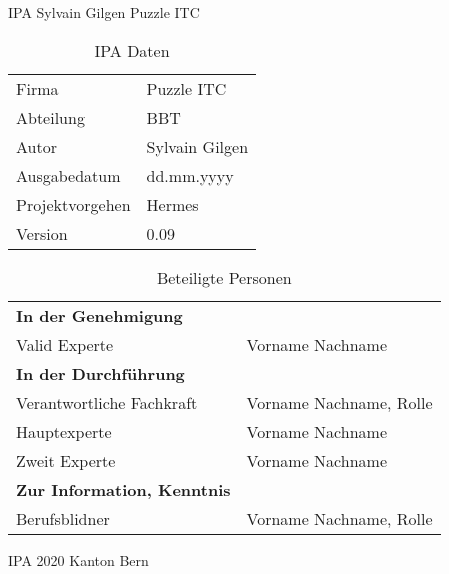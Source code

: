 \begin{titlepage}
    \Huge IPA Sylvain Gilgen Puzzle ITC\normalsize
  \bigbreak
  \begin{table}[h!]
      \begin{tabular}{|R{0.2\textwidth}|L{0.7\textwidth}|}
          \hline
            \\[12pt]
          \hline
          Firma & Puzzle ITC \\
          \hline
          Abteilung & BBT \\
          \hline
          Autor & Sylvain Gilgen \\
          \hline
          Ausgabedatum & dd.mm.yyyy \\
          \hline
          Projektvorgehen & Hermes \\
          \hline
          Version & 0.09 \\
          \hline
        \end{tabular}
        \caption{IPA Daten}
  \end{table}
  \begin{table}[!h]
      \begin{tabular}{|L{0.4\textwidth}|L{0.5\textwidth}|}
          \hline
            \\[12pt]
          \hline
          \textbf{In der Genehmigung} & \\
          \hline
          Valid Experte & Vorname Nachname \\
          \hline
          \textbf{In der Durchführung} & \\
          \hline
          Verantwortliche Fachkraft & Vorname Nachname, Rolle \\
          \hline
          Hauptexperte & Vorname Nachname \\
          \hline
          Zweit Experte & Vorname Nachname \\
          \hline
          \textbf{Zur Information, Kenntnis} & \\
          \hline
          Berufsblidner & Vorname Nachname, Rolle \\
          \hline
      \end{tabular}
      \caption{Beteiligte Personen}
  \end{table}
  \Huge IPA 2020 Kanton Bern
  \end{titlepage}